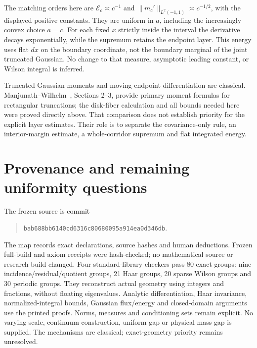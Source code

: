 \documentclass[11pt]{article}
\begin{document}
The matching orders here are $\mathcal E_c\asymp c^{-1}$ and
$\|m_c'\|_{L^2(-1,1)}\asymp c^{-1/2}$, with the displayed positive
constants. They are uniform in $a$, including the increasingly
convex choice $a=c$. For each fixed $x$ strictly inside the
interval the derivative decays exponentially, while the supremum
retains the endpoint layer. This energy uses flat $dx$ on the
boundary coordinate, not the boundary marginal of the joint
truncated Gaussian. No change to that measure, asymptotic leading
constant, or Wilson integral is inferred.

Truncated Gaussian moments and moving-endpoint differentiation
are classical. Manjunath--Wilhelm~\cite{truncnormal}, Sections 2--3,
provide primary moment formulas for rectangular truncations;
the disk-fiber calculation and all bounds needed here were proved
directly above. That comparison does not establish priority for
the explicit layer estimates. Their role is to separate the
covariance-only rule, an interior-margin estimate, a whole-corridor
supremum and flat integrated energy.

\section{Provenance and remaining uniformity questions}
The frozen source is commit
\begin{quote}\small\texttt{bab688bb6140cd6316c80680095a914ea0d346db}.\end{quote}
The map records exact declarations, source hashes and human deductions.
Frozen full-build and axiom receipts were hash-checked; no mathematical
source or research build changed. Four standard-library checkers pass
80 exact groups: nine incidence/residual/quotient groups, 21 Haar groups,
20 sparse Wilson groups and 30 periodic groups. They reconstruct actual
geometry using integers and fractions, without floating eigenvalues.
Analytic differentiation, Haar invariance, normalized-integral bounds,
Gaussian flux/energy and closed-domain arguments use the printed proofs.
Norms, measures and conditioning sets remain explicit. No varying scale,
continuum construction, uniform gap or physical mass gap is supplied.
The mechanisms are classical; exact-geometry priority remains unresolved.
\end{document}
